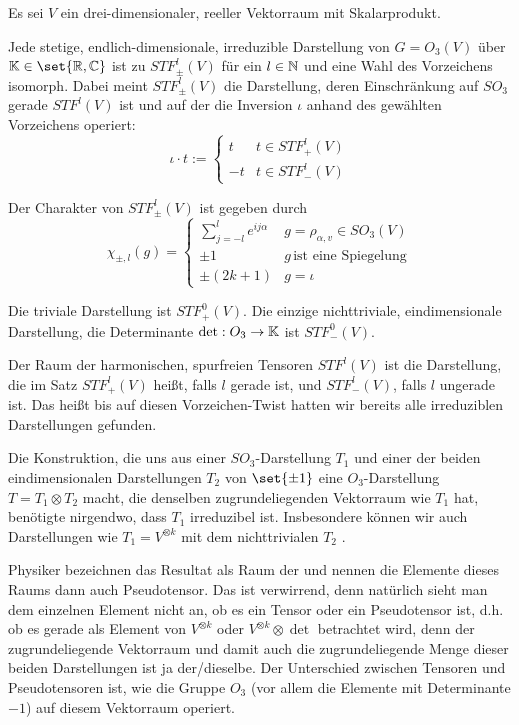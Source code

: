 \begin{corollary}
Es sei $V$ ein drei-dimensionaler, reeller Vektorraum mit Skalarprodukt.

Jede stetige, endlich-dimensionale, irreduzible Darstellung von $G=O_3(V)$ über $\IK\in\set{\IR,\IC}$ ist zu $STF_{\pm}^l(V)$ für ein $l\in\mathbb{N}$ und eine Wahl des Vorzeichens isomorph. Dabei meint $STF_{\pm}^l(V)$ die Darstellung, deren Einschränkung auf $SO_3$ gerade $STF^l(V)$ ist und auf der die Inversion $\iota$ anhand des gewählten Vorzeichens operiert:
\[\iota \cdot t := \begin{cases}
t & t\in STF_+^l(V) \\
-t & t\in STF_-^l(V)
\end{cases}\]

Der Charakter von $STF_{\pm}^l(V)$ ist gegeben durch
\[\chi_{\pm,l}(g) = \begin{cases}
\sum_{j=-l}^l e^{ij\alpha} & g=\rho_{\alpha,v}\in SO_3(V) \\
\pm 1 & g\,\text{ist eine Spiegelung} \\
\pm (2k+1) & g=\iota
\end{cases}\]
\end{corollary}

\begin{remark}
Die triviale Darstellung ist $STF_+^0(V)$. Die einzige nichttriviale, eindimensionale Darstellung, die Determinante $\det: O_3 \to \mathbb{K}$ ist $STF_-^0(V)$.

Der Raum der harmonischen, spurfreien Tensoren $STF^l(V)$ ist die Darstellung, die im Satz $STF_+^l(V)$ heißt, falls $l$ gerade ist, und $STF_-^l(V)$, falls $l$ ungerade ist. Das heißt bis auf diesen Vorzeichen-Twist hatten wir bereits alle irreduziblen Darstellungen gefunden.
\end{remark}

\begin{remark}
Die Konstruktion, die uns aus einer $SO_3$-Darstellung $T_1$ und einer der beiden eindimensionalen Darstellungen $T_2$ von $\set{\pm 1}$ eine $O_3$-Darstellung $T=T_1\otimes T_2$ macht, die denselben zugrundeliegenden Vektorraum wie $T_1$ hat, benötigte nirgendwo, dass $T_1$ irreduzibel ist. Insbesondere können wir auch Darstellungen wie $T_1=V^{\otimes k}$ mit dem nichttrivialen $T_2$ .

Physiker bezeichnen das Resultat als Raum der  und nennen die Elemente dieses Raums dann auch Pseudotensor. Das ist verwirrend, denn natürlich sieht man dem einzelnen Element nicht an, ob es ein Tensor oder ein Pseudotensor ist, d.h. ob es gerade als Element von $V^{\otimes k}$ oder $V^{\otimes k}\otimes\det$ betrachtet wird, denn der zugrundeliegende Vektorraum und damit auch die zugrundeliegende Menge dieser beiden Darstellungen ist ja der/dieselbe. Der Unterschied zwischen Tensoren und Pseudotensoren ist, wie die Gruppe $O_3$ (vor allem die Elemente mit Determinante $-1$) auf diesem Vektorraum operiert.
\end{remark}